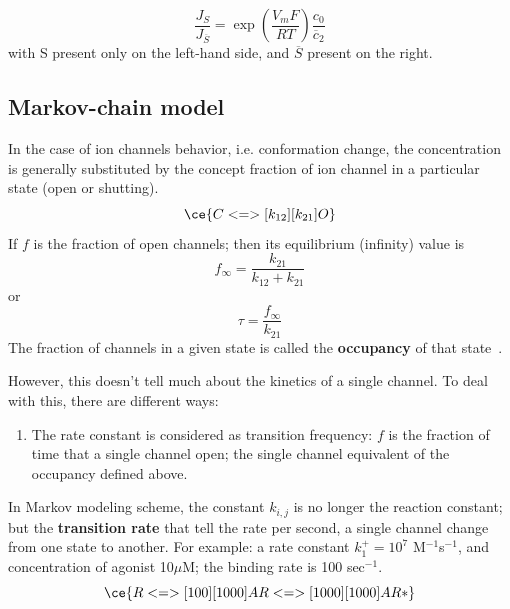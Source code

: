 \begin{equation}
  \label{eq:1404}
  \frac{J_S}{J_{\overline{S}}} = \exp(\frac{V_mF}{RT})\frac{c_0}{\overline{c}_2}
\end{equation}
with S present only on the left-hand side, and $\overline{S}$ present on
the right.


\subsection{Markov-chain model}
\label{sec:markov-chain-model}


In the case of ion channels behavior, i.e. conformation change, the
concentration is generally substituted by the concept fraction of ion
channel in a particular state (open or shutting).
\begin{equation}
  \label{eq:847}
  \ce{C <=>[k_{12}][k_{21}] O}
\end{equation}
If $f$ is the fraction of open channels; then its equilibrium
(infinity) value is
\begin{equation}
  \label{eq:845}
  f_\infty = \frac{k_{21}}{k_{12}+k_{21}}
\end{equation}
or
\begin{equation}
  \label{eq:846}
  \tau = \frac{f_\infty}{k_{21}}
\end{equation}
The fraction of channels in a given state is called the
{\bf occupancy} of that state~\citep{colquhoun1994isc}.

However, this doesn't tell much about the kinetics of a single
channel. To deal with this, there are different ways:
\begin{enumerate}
\item The rate constant is considered as transition frequency: $f$ is
  the fraction of time that a single channel open; the single channel
  equivalent of the occupancy defined above.
\end{enumerate}

In Markov modeling scheme, the constant $k_{i,j}$ is no longer the
reaction constant; but the {\bf transition rate} that tell the rate
per second, a single channel change from one state to another. For
example: a rate constant $k^+_1=10^7$ M$^{-1}$s$^{-1}$, and
concentration of agonist 10$\mu$M; the binding rate is 100
sec$^{-1}$.
\begin{equation}
  \label{eq:852}
  \ce{ R <=>[100][1000] AR <=>[1000][1000] AR*}
\end{equation}



